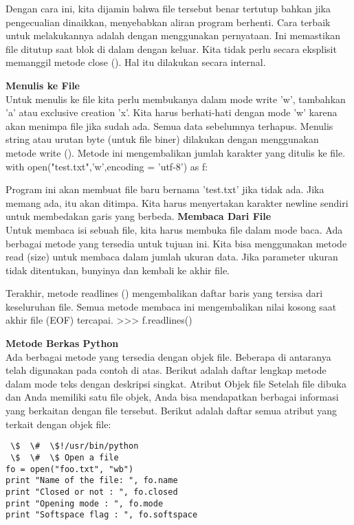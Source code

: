 Dengan cara ini, kita dijamin bahwa file tersebut benar tertutup bahkan jika pengecualian dinaikkan, menyebabkan aliran program berhenti. Cara terbaik untuk melakukannya adalah dengan menggunakan pernyataan. Ini memastikan file ditutup saat blok di dalam dengan keluar. Kita tidak perlu secara eksplisit memanggil metode close (). Hal itu dilakukan secara internal.  

{\fontsize{14pt}{14pt}\selectfont \textbf{Menulis ke File} \\} 
Untuk menulis ke file kita perlu membukanya dalam mode write 'w', tambahkan 'a' atau exclusive creation 'x'. Kita harus berhati-hati dengan mode 'w' karena akan menimpa file jika sudah ada. Semua data sebelumnya terhapus. Menulis string atau urutan byte (untuk file biner) dilakukan dengan menggunakan metode write (). Metode ini mengembalikan jumlah karakter yang ditulis ke file.  
with open("test.txt",'w',encoding = 'utf-8') as f: 

Program ini akan membuat file baru bernama 'test.txt' jika tidak ada. Jika memang ada, itu akan ditimpa. Kita harus menyertakan karakter newline sendiri untuk membedakan garis yang berbeda. 
{\fontsize{14pt}{14pt}\selectfont \textbf{Membaca Dari File} \\} 
Untuk membaca isi sebuah file, kita harus membuka file dalam mode baca. Ada berbagai metode yang tersedia untuk tujuan ini. Kita bisa menggunakan metode read (size) untuk membaca dalam jumlah ukuran data. Jika parameter ukuran tidak ditentukan, bunyinya dan kembali ke akhir file.  

Terakhir, metode readlines () mengembalikan daftar baris yang tersisa dari keseluruhan file. Semua metode membaca ini mengembalikan nilai kosong saat akhir file (EOF) tercapai.  
>>> f.readlines()  

{\fontsize{14pt}{14pt}\selectfont \textbf{Metode Berkas Python} \\} 
Ada berbagai metode yang tersedia dengan objek file. Beberapa di antaranya telah digunakan pada contoh di atas. Berikut adalah daftar lengkap metode dalam mode teks dengan deskripsi singkat. Atribut Objek file Setelah file dibuka dan Anda memiliki satu file objek, Anda bisa mendapatkan berbagai informasi yang berkaitan dengan file tersebut. Berikut adalah daftar semua atribut yang terkait dengan objek file: 

\begin{verbatim}
 \$  \#  \$!/usr/bin/python 
 \$  \#  \$ Open a file  
fo = open("foo.txt", "wb") 
print "Name of the file: ", fo.name 
print "Closed or not : ", fo.closed 
print "Opening mode : ", fo.mode 
print "Softspace flag : ", fo.softspace  
\end{verbatim}

